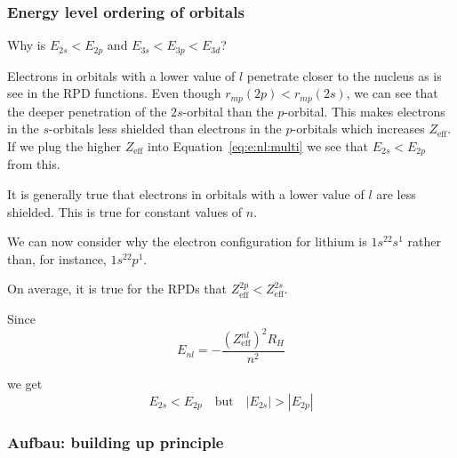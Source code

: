 \documentclass[../mit-general-chemistry.tex]{subfiles}
\begin{document}
\subsubsection{Energy level ordering of orbitals}


Why is $E_{2s} < E_{2p}$ and $E_{3s} < E_{3p} < E_{3d}$?


\begin{center}
\end{center}


Electrons in orbitals with a lower value of $l$ penetrate closer to
the nucleus as is see in the RPD functions. Even though $r_{mp}(2p) <
r_{mp}(2s)$, we can see that the deeper penetration of the
$2s$-orbital than the $p$-orbital. This makes electrons in the
$s$-orbitals less shielded than electrons in the $p$-orbitals which
increases $Z_{\text{eff}}$. If we plug the higher $Z_{\text{eff}}$
into Equation~\ref{eq:e:nl:multi} we see that $E_{2s} < E_{2p}$ from
this.

It is generally true that electrons in orbitals with a lower value of
$l$ are less shielded. This is true for constant values of $n$.






We can now consider why the electron configuration for lithium is
$1s^22s^1$ rather than, for instance, $1s^22p^1$.

On average, it is true for the RPDs that $Z^{2p}_{\text{eff}} <
Z^{2s}_{\text{eff}}$.

Since
\begin{equation*}
  E_{nl} = -\frac{\left(Z_{\text{eff}}^{nl}\right)^2 R_H}{n^2}
\end{equation*}

we get
\begin{equation*}
  E_{2s} < E_{2p} \quad\text{but}\quad |E_{2s}| > |E_{2p}|
\end{equation*}


\subsubsection{Aufbau: building up principle}
\end{document}
